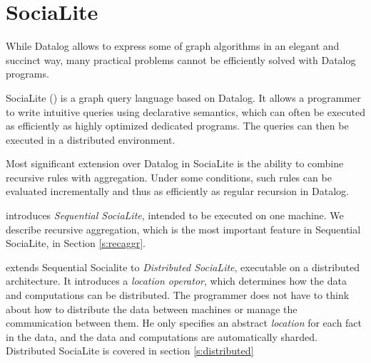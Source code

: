 
\chapter{SociaLite}\label{r:socialite}

While Datalog allows to express some of graph algorithms
in an elegant and succinct way, many practical problems cannot be efficiently solved with Datalog programs. 

SociaLite (\cite{socialite, distsoc}) is a graph query language based on Datalog.  It allows a programmer to write intuitive queries using declarative semantics, which can often be executed as efficiently as highly optimized dedicated programs. The queries can then be executed in a distributed environment.

Most significant extension over Datalog in SociaLite is the ability to combine recursive rules with aggregation. Under some conditions, such rules can be evaluated incrementally and thus as efficiently as regular recursion in Datalog.

\cite{socialite} introduces \emph{Sequential SociaLite}, intended to be executed on one machine. We describe recursive aggregation, which is the most important feature in Sequential SociaLite, in Section \ref{s:recaggr}.

\cite{distsoc} extends Sequential Socialite to \emph{Distributed SociaLite}, executable on a distributed architecture. It introduces a \emph{location operator}, which determines how the data and computations can be distributed. The programmer does not have to think about how to distribute the data between machines or manage the communication between them. He only specifies an abstract \emph{location} for each fact in the data, and the data and computations are automatically sharded. Distributed SociaLite is covered in section \ref{s:distributed}







